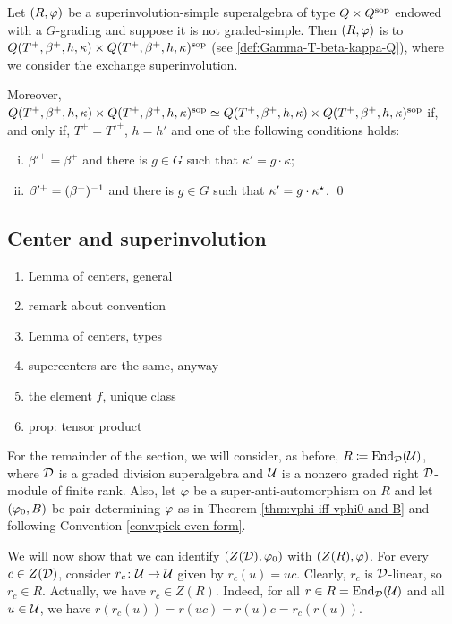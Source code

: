 \begin{thm}
    Let $(R, \varphi)$ be a superinvolution-simple superalgebra of type $Q\times Q^{\mathrm{sop}}$ endowed with a $G$-grading and suppose it is not graded-simple. 
    Then $(R, \varphi)$ is to $Q (T^+, \beta^+, h, \kappa) \times Q (T^+, \beta^+, h, \kappa)^{\mathrm{sop}}$ (see \cref{def:Gamma-T-beta-kappa-Q}), where we consider the exchange superinvolution. 
    
    Moreover, $Q (T^+, \beta^+, h, \kappa) \times Q (T^+, \beta^+, h, \kappa)^{\mathrm{sop}} \simeq Q (T^+, \beta^+, h, \kappa) \times Q (T^+, \beta^+, h, \kappa)^{\mathrm{sop}}$ if, and only if, $T^+ = T'^+$, $h = h'$ and one of the following conditions holds: 
    \begin{enumerate}[(i)]
	    \item $\beta'^+ = \beta^+$ and there is $g\in G$ such that $\kappa' = g \cdot \kappa$;
	    \item $\beta'^+ = (\beta^+)^{-1}$ and there is $g\in G$ such that $\kappa' = g \cdot \kappa^\star$. \qed
	\end{enumerate}
\end{thm}

\subsection{Center and superinvolution}

\begin{enumerate}
    \item Lemma of centers, general
    \item remark about convention
    \item Lemma of centers, types
    \item supercenters are the same, anyway
    \item the element $f$, unique class
    \item prop: tensor product
\end{enumerate}


For the remainder of the section, we will consider, as before, $R \coloneqq \operatorname{End}_{\mathcal{D}}(\mathcal U)$, where $\mathcal{D}$ is a graded division superalgebra and $\mathcal U$ is a nonzero graded right $\mathcal{D}$-module of finite rank.
Also, let $\varphi$ be a super-anti-automorphism on $R$ and let $(\varphi_0, B)$ be pair determining $\varphi$ as in Theorem \ref{thm:vphi-iff-vphi0-and-B} and following Convention \ref{conv:pick-even-form}.

We will now show that we can identify $(Z(\mathcal{D}), \varphi_0)$ with $(Z(R), \varphi)$.
For every $c\in Z(\mathcal{D})$, consider $r_c\colon \mathcal U \to \mathcal U$ given by $r_c(u) = uc$.
Clearly, $r_c$ is $\mathcal{D}$-linear, so $r_c \in R$.
Actually, we have $r_c\in Z(R)$.
Indeed, for all $r\in R = \operatorname{End}_{\mathcal{D}}(\mathcal U)$ and all $u\in \mathcal U$, we have $r (r_c(u)) = r(uc) = r(u) c = r_c(r(u))$.

